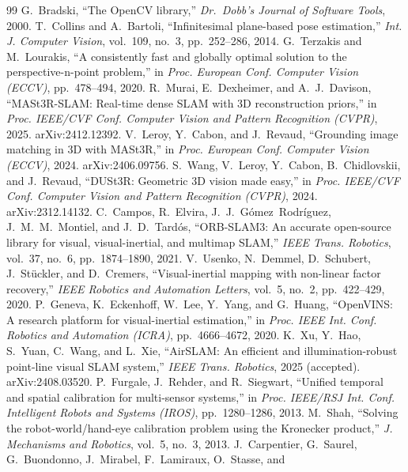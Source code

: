 \documentclass[conference,10pt]{IEEEtran}
\begin{document}
\begin{thebibliography}{99}
 G.~Bradski, ``The OpenCV library,'' \emph{Dr.\ Dobb's Journal of Software Tools}, 2000.
 T.~Collins and A.~Bartoli, ``Infinitesimal plane-based pose estimation,'' \emph{Int. J. Computer
Vision}, vol.~109, no.~3, pp.~252--286, 2014.
 G.~Terzakis and M.~Lourakis, ``A consistently fast and globally optimal solution to the
perspective-n-point problem,'' in \emph{Proc. European Conf. Computer Vision (ECCV)}, pp.~478--494, 2020.
 R.~Murai, E.~Dexheimer, and A.~J.~Davison, ``MASt3R-SLAM: Real-time dense SLAM with 3D
reconstruction priors,'' in \emph{Proc. IEEE/CVF Conf. Computer Vision and Pattern Recognition (CVPR)}, 2025.
arXiv:2412.12392.
 V.~Leroy, Y.~Cabon, and J.~Revaud, ``Grounding image matching in 3D with MASt3R,'' in
\emph{Proc. European Conf. Computer Vision (ECCV)}, 2024. arXiv:2406.09756.
 S.~Wang, V.~Leroy, Y.~Cabon, B.~Chidlovskii, and J.~Revaud, ``DUSt3R: Geometric 3D vision made
easy,'' in \emph{Proc. IEEE/CVF Conf. Computer Vision and Pattern Recognition (CVPR)}, 2024. arXiv:2312.14132.
 C.~Campos, R.~Elvira, J.~J.~G\'omez~Rodr\'iguez, J.~M.~M.~Montiel, and J.~D.~Tard\'os,
``ORB-SLAM3: An accurate open-source library for visual, visual-inertial, and multimap SLAM,'' \emph{IEEE Trans. Robotics},
vol.~37, no.~6, pp.~1874--1890, 2021.
 V.~Usenko, N.~Demmel, D.~Schubert, J.~St\"uckler, and D.~Cremers, ``Visual-inertial mapping with
non-linear factor recovery,'' \emph{IEEE Robotics and Automation Letters}, vol.~5, no.~2, pp.~422--429, 2020.
 P.~Geneva, K.~Eckenhoff, W.~Lee, Y.~Yang, and G.~Huang, ``OpenVINS: A research platform for
visual-inertial estimation,'' in \emph{Proc. IEEE Int. Conf. Robotics and Automation (ICRA)}, pp.~4666--4672, 2020.
 K.~Xu, Y.~Hao, S.~Yuan, C.~Wang, and L.~Xie, ``AirSLAM: An efficient and illumination-robust
point-line visual SLAM system,'' \emph{IEEE Trans. Robotics}, 2025 (accepted). arXiv:2408.03520.
 P.~Furgale, J.~Rehder, and R.~Siegwart, ``Unified temporal and spatial calibration for
multi-sensor systems,'' in \emph{Proc. IEEE/RSJ Int. Conf. Intelligent Robots and Systems (IROS)}, pp.~1280--1286, 2013.
 M.~Shah, ``Solving the robot-world/hand-eye calibration problem using the Kronecker
product,'' \emph{J. Mechanisms and Robotics}, vol.~5, no.~3, 2013.
 J.~Carpentier, G.~Saurel, G.~Buondonno, J.~Mirabel, F.~Lamiraux, O.~Stasse, and

\end{thebibliography}
\end{document}
